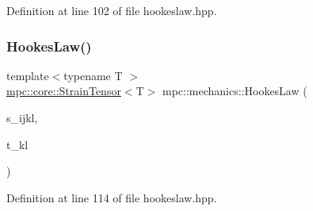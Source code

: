 Definition at line 102 of file hookeslaw.\+hpp.

\mbox{\label{namespacempc_1_1mechanics_a769777e6d9b85dad0caae5a471deefe5}} 
\subsubsection{\texorpdfstring{Hookes\+Law()}{HookesLaw()}\hspace{0.1cm}{\footnotesize\ttfamily [2/2]}}
{\footnotesize\ttfamily template$<$typename T $>$ \\
\mbox{\hyperlink{structmpc_1_1core_1_1_strain_tensor}{mpc\+::core\+::\+Strain\+Tensor}}$<$T$>$ mpc\+::mechanics\+::\+Hookes\+Law (\begin{DoxyParamCaption}\item[{\mbox{\hyperlink{structmpc_1_1core_1_1_compliance_tensor}{mpc\+::core\+::\+Compliance\+Tensor}}$<$ T $>$ \&}]{s\+\_\+ijkl,  }\item[{\mbox{\hyperlink{structmpc_1_1core_1_1_stress_tensor}{mpc\+::core\+::\+Stress\+Tensor}}$<$ T $>$ \&}]{t\+\_\+kl }\end{DoxyParamCaption})}



Definition at line 114 of file hookeslaw.\+hpp.

